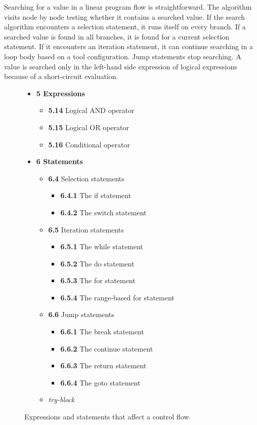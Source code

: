 Searching for a value in a linear program flow is straightforward. The algorithm visits node by node testing whether it contains a searched value. If the search algorithm encounters a selection statement, it runs itself on every branch. If a searched value is found in all branches, it is found for a current selection statement. If it encounters an iteration statement, it can continue searching in a loop body based on a tool configuration. Jump statements stop searching. A value is searched only in the left-hand side expression of logical expressions because of a short-circuit evaluation.

\begin{figure}[t!]
\begin{itemize}
\item{\textbf{5 Expressions}}
	\begin{itemize}
	\item{\textbf{5.14} Logical AND operator}
	\item{\textbf{5.15} Logical OR operator}
	\item{\textbf{5.16} Conditional operator}
	\end{itemize}
\item{\textbf{6 Statements}}
	\begin{itemize}
	\item{\textbf{6.4} Selection statements}
		\begin{itemize}
		\item{\textbf{6.4.1} The if statement}
		\item{\textbf{6.4.2} The switch statement}
		\end{itemize}
	\item{\textbf{6.5} Iteration statements}
		\begin{itemize}
		\item{\textbf{6.5.1} The while statement}
		\item{\textbf{6.5.2} The do statement}
		\item{\textbf{6.5.3} The for statement}
		\item{\textbf{6.5.4} The range-based for statement}
		\end{itemize}
	\item{\textbf{6.6} Jump statements}
		\begin{itemize}
		\item{\textbf{6.6.1} The break statement}
		\item{\textbf{6.6.2} The continue statement}
		\item{\textbf{6.6.3} The return statement}
		\item{\textbf{6.6.4} The goto statement}
		\end{itemize}
	\item{\textit{try-block}}
	\end{itemize}
\end{itemize}
\caption{Expressions and statements that affect a control flow.}
\label{control-stmt-expr}
\end{figure}

